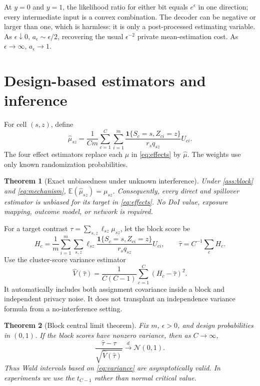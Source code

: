 \documentclass[10pt]{article}
\newtheorem{theorem}{Theorem}
\theoremstyle{definition}
\theoremstyle{remark}
\newcommand{\E}{\mathbb{E}}
\newcommand{\ind}{\mathbf{1}}
\newcommand{\doisig}{a_{\epsilon}}
\begin{document}
At $y=0$ and $y=1$, the likelihood ratio for either bit equals $e^{\epsilon}$ in one
direction; every intermediate input is a convex combination. The decoder can be negative or
larger than one, which is harmless: it is only a post-processed estimating variable. As
$\epsilon\downarrow0$, $\doisig\sim\epsilon/2$, recovering the usual $\epsilon^{-2}$ private
mean-estimation cost. As $\epsilon\to\infty$, $\doisig\to1$.

\section{Design-based estimators and inference}
\label{sec:estimation}

For cell $(s,z)$, define
\begin{equation}
  \widehat\mu_{sz}
  =\frac{1}{Cm}\sum_{c=1}^C\sum_{i=1}^m
    \frac{\ind\{S_c=s,Z_{ci}=z\}}
         {r_s q_{sz}}U_{ci}.
  \label{eq:ht}
\end{equation}
The four effect estimators replace each $\mu$ in \eqref{eq:effects} by
$\widehat\mu$. The weights use only known randomization probabilities.

\begin{theorem}[Exact unbiasedness under unknown interference]
\label{thm:unbiased}
Under \cref{ass:block} and \eqref{eq:mechanism}, $\E(\widehat\mu_{sz})=\mu_{sz}$.
Consequently, every direct and spillover estimator is unbiased for its target in
\eqref{eq:effects}. No DoI value, exposure mapping, outcome model, or network is required.
\end{theorem}

For a target contrast $\tau=\sum_{s,z}\ell_{sz}\mu_{sz}$, let the block score be
\begin{equation}
  H_c=\frac{1}{m}\sum_{i=1}^m\sum_{s,z}
  \ell_{sz}\frac{\ind\{S_c=s,Z_{ci}=z\}}{r_s q_{sz}}U_{ci},
  \qquad \widehat\tau=C^{-1}\sum_c H_c.
  \label{eq:blockscore}
\end{equation}
Use the cluster-score variance estimator
\begin{equation}
  \widehat V(\widehat\tau)
  =\frac{1}{C(C-1)}\sum_{c=1}^C(H_c-\widehat\tau)^2.
  \label{eq:variance}
\end{equation}
It automatically includes both assignment covariance inside a block and independent privacy
noise. It does not transplant an independence variance formula from a no-interference setting.

\begin{theorem}[Block central limit theorem]
\label{thm:clt}
Fix $m$, $\epsilon>0$, and design probabilities in $(0,1)$. If the block scores have
nonzero variance, then as $C\to\infty$,
\[
  \frac{\widehat\tau-\tau}{\sqrt{\widehat V(\widehat\tau)}}
  \overset{d}{\longrightarrow}\mathcal N(0,1).
\]
Thus Wald intervals based on \eqref{eq:variance} are asymptotically valid. In experiments we
use the $t_{C-1}$ rather than normal critical value.
\end{theorem}
\end{document}
